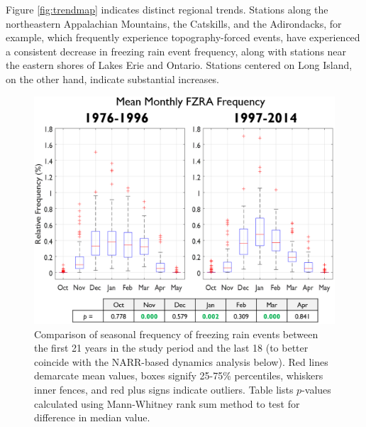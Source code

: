 \documentclass[twocol]{ametsoc}
\begin{document}
Figure \ref{fig:trendmap} indicates distinct regional trends. Stations along the northeastern Appalachian Mountains, the Catskills, and the Adirondacks, for example, which frequently experience topography-forced events, have experienced a consistent decrease in freezing rain event frequency, along with stations near the eastern shores of Lakes Erie and Ontario. Stations centered on Long Island, on the other hand, indicate substantial increases.  

\begin{figure}
\centering
\includegraphics[width=.9\textwidth]{Seasonal.PNG}
\caption{\label{fig:seasonal} Comparison of seasonal frequency of freezing rain events between the first 21 years in the study period and the last 18 (to better coincide with the NARR-based dynamics analysis below). Red lines demarcate mean values, boxes signify 25-75\% percentiles, whiskers inner fences, and red plus signs indicate outliers. Table lists $p$-values calculated using Mann-Whitney rank sum method to test for difference in median value.}
\end{figure}
\end{document}
